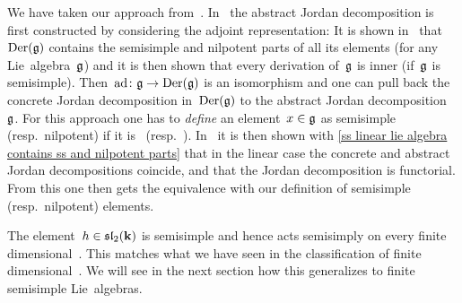 \begin{remark}
  We have taken our approach from~\cite[I.\S6.3]{bourbaki_lie}.
  In~\cite{humphreys} the abstract Jordan decomposition is first constructed by considering the adjoint representation:
  It is shown in~\cite[\S 4.2, \S 5.3]{humphreys} that~$\operatorname{Der}(\mathfrak{g})$ contains the semisimple and nilpotent parts of all its elements (for any Lie~algebra~$\mathfrak{g}$) and it is then shown that every derivation of~$\mathfrak{g}$ is inner (if~$\mathfrak{g}$ is semisimple).
  Then~$\operatorname{ad} \colon \mathfrak{g} \to \operatorname{Der}(\mathfrak{g})$ is an isomorphism and one can pull back the concrete Jordan decomposition in~$\operatorname{Der}(\mathfrak{g})$ to the abstract Jordan decomposition~$\mathfrak{g}$.
  For this approach one has to \emph{define} an element~$x \in \mathfrak{g}$ as semisimple (resp.\ nilpotent) if it is~{\adsemisimple} (resp.\ {\adnilpotent}).
  In~\cite[\S 6]{humphreys} it is then shown with \cref{ss linear lie algebra contains ss and nilpotent parts} that in the linear case the concrete and abstract Jordan decompositions coincide, and that the Jordan decomposition is functorial.
  From this one then gets the equivalence with our definition of semisimple (resp.\ nilpotent) elements.
\end{remark}


\begin{example}
  The element~$h \in \mathfrak{sl}_2(\mathbf{k})$ is semisimple and hence acts semisimply on every finite dimensional~{}.
  This matches what we have seen in the classification of finite dimensional~{}.
  We will see in the next section how this generalizes to finite semisimple Lie~algebras.
\end{example}


